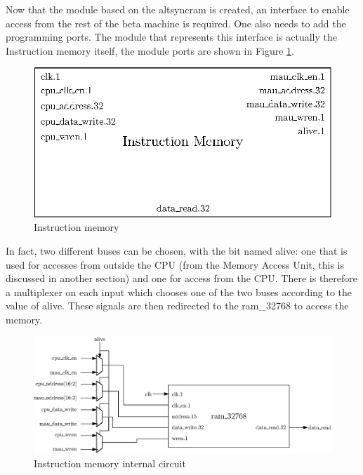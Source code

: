 Now that the module based on the altsyncram is created,  an interface to enable 
access from the rest of the beta machine is required. One also needs to add the programming ports. The
module that represents this interface is actually the Instruction memory itself, the module ports
are shown in Figure \ref{fig:components/im}.

\begin{figure}[H]
    \centering
    \includegraphics[scale=0.8]{Chapter3-CPU/res/instruction_memory}
    \caption{Instruction memory}
    \label{fig:components/im}
\end{figure}

In fact, two different buses can be chosen, with the bit named alive: one that is used for 
accesses from outside the CPU (from the Memory Access Unit, this is discussed in another 
section) and one for access from the CPU. There is therefore a multiplexer on each input which
chooses one of the two buses according to the value of alive. These signals are then redirected to 
the ram\_32768 to access the memory.

\begin{figure}[H]
    \centering
    \includegraphics[width=\linewidth]{Chapter3-CPU/res/instruction_memory_in}
    \caption{Instruction memory internal circuit}
    \label{fig:components/im_in}
\end{figure}

